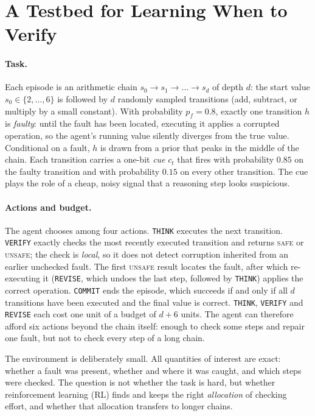 \section{A Testbed for Learning When to Verify}
\label{sec:setup}

\paragraph{Task.}
Each episode is an arithmetic chain $s_0 \to s_1 \to \dots \to s_d$ of depth $d$: the start value $s_0 \in \{2,\dots,6\}$ is followed by $d$ randomly sampled transitions (add, subtract, or multiply by a small constant). With probability $p_f = 0.8$, exactly one transition $h$ is \emph{faulty}: until the fault has been located, executing it applies a corrupted operation, so the agent's running value silently diverges from the true value. Conditional on a fault, $h$ is drawn from a prior that peaks in the middle of the chain. Each transition carries a one-bit \emph{cue} $c_t$ that fires with probability $0.85$ on the faulty transition and with probability $0.15$ on every other transition. The cue plays the role of a cheap, noisy signal that a reasoning step looks suspicious.

\paragraph{Actions and budget.}
The agent chooses among four actions. \texttt{THINK} executes the next transition. \texttt{VERIFY} exactly checks the most recently executed transition and returns \textsc{safe} or \textsc{unsafe}; the check is \emph{local}, so it does not detect corruption inherited from an earlier unchecked fault. The first \textsc{unsafe} result locates the fault, after which re-executing it (\texttt{REVISE}, which undoes the last step, followed by \texttt{THINK}) applies the correct operation. \texttt{COMMIT} ends the episode, which succeeds if and only if all $d$ transitions have been executed and the final value is correct. \texttt{THINK}, \texttt{VERIFY} and \texttt{REVISE} each cost one unit of a budget of $d + 6$ units. The agent can therefore afford six actions beyond the chain itself: enough to check some steps and repair one fault, but not to check every step of a long chain.

The environment is deliberately small. All quantities of interest are exact: whether a fault was present, whether and where it was caught, and which steps were checked. The question is not whether the task is hard, but whether reinforcement learning (RL) finds and keeps the right \emph{allocation} of checking effort, and whether that allocation transfers to longer chains.

